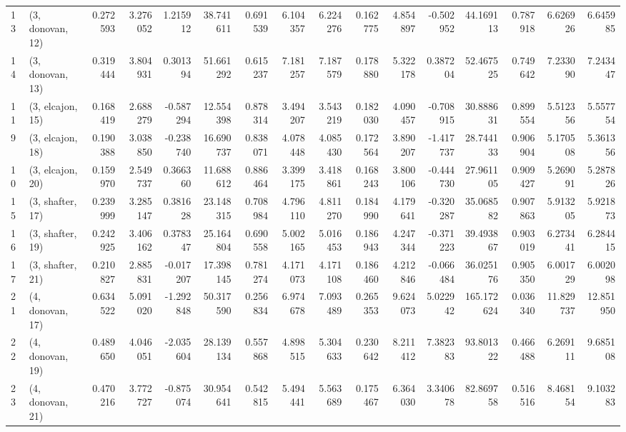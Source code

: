 \begin{tabular}{llrrrrrrrrrrrrrr}
13 &  (3, donovan, 12) &   0.272593 &  3.276052 &  1.215912 &  38.741611 &  0.691539 &   6.104357 &  6.224276 &  0.162775 &  4.854897 & -0.502952 &   44.169113 &  0.787918 &   6.626926 &   6.645985 \\
14 &  (3, donovan, 13) &   0.319444 &  3.804931 &  0.301394 &  51.661292 &  0.615237 &   7.181257 &  7.187579 &  0.178880 &  5.322178 &  0.387204 &   52.467525 &  0.749642 &   7.233090 &   7.243447 \\
11 &  (3, elcajon, 15) &   0.168419 &  2.688279 & -0.587294 &  12.554398 &  0.878314 &   3.494207 &  3.543219 &  0.182030 &  4.090457 & -0.708915 &   30.888631 &  0.899554 &   5.512356 &   5.557754 \\
9  &  (3, elcajon, 18) &   0.190388 &  3.038850 & -0.238740 &  16.690737 &  0.838071 &   4.078448 &  4.085430 &  0.172564 &  3.890207 & -1.417737 &   28.744133 &  0.906904 &   5.170508 &   5.361356 \\
10 &  (3, elcajon, 20) &   0.159970 &  2.549737 &  0.366360 &  11.688612 &  0.886464 &   3.399175 &  3.418861 &  0.168243 &  3.800106 & -0.444730 &   27.961105 &  0.909427 &   5.269091 &   5.287826 \\
15 &  (3, shafter, 17) &   0.239999 &  3.285147 &  0.381628 &  23.148315 &  0.708984 &   4.796110 &  4.811270 &  0.184990 &  4.179641 & -0.320287 &   35.068582 &  0.907863 &   5.913205 &   5.921873 \\
16 &  (3, shafter, 19) &   0.242925 &  3.406162 &  0.378347 &  25.164804 &  0.690558 &   5.002165 &  5.016453 &  0.186943 &  4.247344 & -0.371223 &   39.493867 &  0.903019 &   6.273441 &   6.284415 \\
17 &  (3, shafter, 21) &   0.210827 &  2.885831 & -0.017207 &  17.398145 &  0.781274 &   4.171073 &  4.171108 &  0.186460 &  4.212846 & -0.066484 &   36.025176 &  0.905350 &   6.001729 &   6.002098 \\
21 &  (4, donovan, 17) &   0.634522 &  5.091020 & -1.292848 &  50.317590 &  0.256834 &   6.974678 &  7.093489 &  0.265353 &  9.624073 &  5.022942 &  165.172624 &  0.036340 &  11.829737 &  12.851950 \\
22 &  (4, donovan, 19) &   0.489650 &  4.046051 & -2.035604 &  28.139134 &  0.557868 &   4.898515 &  5.304633 &  0.230642 &  8.211412 &  7.382383 &   93.801322 &  0.466488 &   6.269111 &   9.685108 \\
23 &  (4, donovan, 21) &   0.470216 &  3.772727 & -0.875074 &  30.954641 &  0.542815 &   5.494441 &  5.563689 &  0.175467 &  6.364030 &  3.340678 &   82.869758 &  0.516516 &   8.468154 &   9.103283 \\

\end{tabular}
